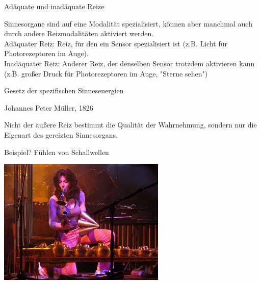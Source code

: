 \documentclass{beamer}
\begin{document}
\begin{frame}{Adäquate und inadäquate Reize}

Sinnesorgane sind auf eine Modalität spezialisiert, können aber manchmal auch durch andere Reizmodalitäten aktiviert werden. \\[0.5 cm]



Adäquater Reiz: Reiz, für den ein Sensor spezialisiert ist (z.B. Licht für Photorezeptoren im Auge).  \\[0.2 cm]

Inadäquater Reiz: Anderer Reiz, der denselben Sensor trotzdem aktivieren kann (z.B. großer Druck für Photorezeptoren im Auge, "Sterne sehen") \\ [0.2]


\end{frame}




\begin{frame}{Gesetz der spezifischen Sinnesenergien}


\begin{block}{Johannes Peter Müller, 1826}

Nicht der äußere Reiz bestimmt die Qualität der Wahrnehmung, sondern nur die Eigenart des gereizten Sinnesorgans.

\end{block}


 
Beispiel?  Fühlen von Schallwellen
    
    
\begin{center}
    \includegraphics[width=0.6\textwidth]{evelyn_glennie.jpg}
\end{center}


    
\end{frame}
\end{document}
